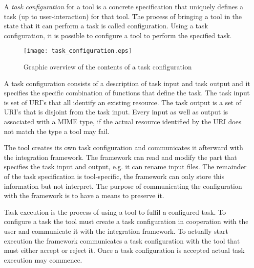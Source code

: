 \documentclass{article}
\begin{document}
   A \textit{task configuration} for a tool is a concrete specification that
   uniquely defines a task (up to user-interaction) for that tool. The process
   of bringing a tool in the state that it can perform a task is called
   configuration. Using a task configuration, it is possible to configure a
   tool to perform the specified task.

   \begin{figure}[H]
    \begin{center}
     \texttt{[image: task\_configuration.eps]}
    \end{center}
    \caption{Graphic overview of the contents of a task configuration}
   \end{figure}

   \noindent A task configuration consists of a description of task input and
   task output and it specifies the specific combination of functions that
   define the task. The task input is set of URI's that all identify an
   existing resource. The task output is a set of URI's that is disjoint from
   the task input. Every input as well as output is associated with a MIME
   type, if the actual resource identified by the URI does not match the type a
   tool may fail.
 
   The tool creates its own task configuration and communicates it afterward
   with the integration framework. The framework can read and modify the part
   that specifies the task input and output, e.g. it can rename input files.
   The remainder of the task specification is tool-specific, the framework can
   only store this information but not interpret. The purpose of communicating
   the configuration with the framework is to have a means to preserve it.
   
   Task execution is the process of using a tool to fulfil a configured task.
   To configure a task the tool must create a task configuration in cooperation
   with the user and communicate it with the integration framework. To actually
   start execution the framework communicates a task configuration with the
   tool that must either accept or reject it. Once a task configuration is
   accepted actual task execution may commence.

\end{document}

